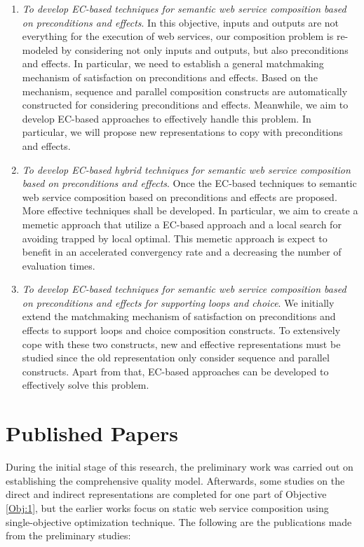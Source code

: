 \begin{enumerate}
\begin{enumerate}
  \item \emph{To develop EC-based techniques for semantic web service composition based on preconditions and effects}. In this objective, inputs and outputs are not everything for the execution of web services, our composition problem is re-modeled by considering not only inputs and outputs, but also preconditions and effects. In particular, we need to establish a general matchmaking mechanism of satisfaction on preconditions and effects. Based on the mechanism, sequence and parallel composition constructs are automatically constructed for considering preconditions and effects. Meanwhile, we aim to develop EC-based approaches to effectively handle this problem. In particular, we will propose new representations to copy with preconditions and effects.

  \item \emph{To develop EC-based hybrid techniques for semantic web service composition based on preconditions and effects}. Once the EC-based techniques to semantic web service composition based on preconditions and effects are proposed. More effective techniques shall be developed. In particular, we aim to create a memetic approach that utilize a EC-based approach and a local search for avoiding trapped by local optimal. This memetic approach is expect to benefit in an accelerated convergency rate and a decreasing the number of evaluation times.
    
   \item \emph{To develop EC-based techniques for semantic web service composition based on preconditions and effects for supporting loops and choice}. We initially extend the matchmaking mechanism of satisfaction on preconditions and effects to support loops and choice composition constructs. To extensively cope with these two constructs, new and effective representations must be studied since the old representation only consider sequence and parallel constructs. Apart from that, EC-based approaches can be developed to effectively solve this problem.

 
 \end{enumerate}
 
\end{enumerate}

\section{Published Papers}

During the initial stage of this research, the preliminary work was carried out on establishing the comprehensive quality model.  Afterwards, some studies on the direct and indirect representations are completed for one part of Objective \ref{Obj:1}, but the earlier works focus on static web service composition using single-objective optimization technique. The following are the publications made from the preliminary studies:

